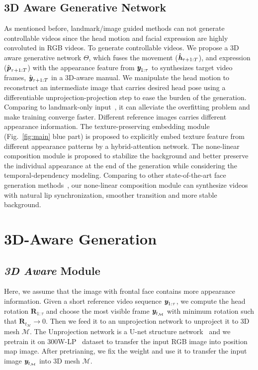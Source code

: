 \documentclass[runningheads]{llncs}
\def\mathbi#1{\textbf{\em #1}}
\providecommand{\ytian}[1]{\textcolor{green}{[{\bf #1}]}}
\begin{document}
\subsection{3D Aware Generative Network}
\label{subsec:3dgenerator}
As mentioned before, landmark/image guided methods can not generate controllable videos since the head motion and facial expression are highly convoluted in RGB videos. To generate controllable videos. We propose a 3D aware generative network $\Theta$, which fuses the movement ($\hat{\mathbi{h}}_{\tau + 1:T}$), and expression ($\hat{\mathbi{p}}_{\tau + 1:T}$) with the appearance feature from ${\mathbi{y}}_{1:\tau }$ to synthesizes target video frames, $\hat{\mathbi{y}}_{\tau + 1:T}$ in a 3D-aware manual. We manipulate the head motion to reconstruct an intermediate image that carries desired head pose using a differentiable unprojection-projection step to ease the burden of the generation. Comparing to landmark-only input~\cite{zakharov2019few,wang2018fewshotvid2vid,wang2018high}, it can alleviate the overfitting problem and make training converge faster. Different reference images carries different appearance information. The texture-preserving embedding module (Fig.~\ref{fig:main} blue part) is proposed to explicitly embed texture feature from different  appearance patterns by a hybrid-attention network. The none-linear composition module is proposed to stabilize the background and better preserve the individual appearance at the end of the generation while considering the temporal-dependency modeling. Comparing to other state-of-the-art face generation methods~\cite{chung2017you,pumarola2019ganimation,zhou2019talking,zakharov2019few,wang2018high}, our none-linear composition module can synthesize videos with natural lip synchronization, smoother transition and more stable background.

\section{3D-Aware Generation}
\label{sec:3dgan}
\subsection{\textit{\textbf{3D Aware}} Module}
\label{subsec:3d_man}

{ \indent Here, we assume that the image with frontal face contains more appearance information. Given a short reference video sequence $\mathbi{y}_{1:\tau}$, we compute the head rotation $\mathbf{R}_{1:\tau}$ and choose the most visible frame $\mathbi{y}_{t_{\mathcal{M}}}$ with minimum rotation such that $\mathbf{R}_{t_{\mathcal{M}}} \rightarrow 0$. Then we feed it to an unprojection network to unproject it to 3D mesh $\mathcal{M}$. The Unprojection network is a U-net structure network~\cite{feng2018joint} and we pretrain it on  300W-LP~\cite{zhu2016face} dataset to transfer the input RGB image into position map image. After pretrianing, we fix the weight and use it to transfer the input image $\mathbi{y}_{t_{\mathcal{M}}}$ into 3D mesh $\mathcal{M}$.}
 
\end{document}

